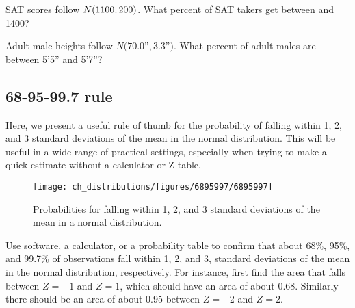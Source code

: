\begin{exercisewrap}
\begin{nexercise}
SAT scores follow $N(1100{}, 200{})$.
What percent of SAT takers get between \satmean{} and
1400?\footnotemark
\end{nexercise}
\end{exercisewrap}

\begin{exercisewrap}
\begin{nexercise}
Adult male heights follow $N(70.0$''$, 3.3$''$)$.
What percent of adult males are between 5'5''
and 5'7''?\footnotemark{}
\end{nexercise}
\end{exercisewrap}


\subsection{68-95-99.7 rule}

Here, we present a useful rule of thumb for the probability of falling within 1, 2, and 3 standard deviations of the mean in the normal distribution. This will be useful in a wide range of practical settings, especially when trying to make a quick estimate without a calculator or Z-table.

\begin{figure}[hht]
\centering
\texttt{[image: ch\_distributions/figures/6895997/6895997]}
\caption{Probabilities for falling within 1, 2, and 3 standard deviations of the mean in a normal distribution.}
\label{6895997}
\end{figure}

\begin{exercisewrap}
\begin{nexercise}
Use software, a calculator, or a probability table
to confirm that about 68\%, 95\%, and 99.7\%
of observations fall within 1, 2, and 3, standard deviations
of the mean in the normal distribution, respectively.
For instance, first find the area that falls between $Z=-1$
and $Z=1$, which should have an area of about 0.68.
Similarly there should be an area of about 0.95 between
$Z=-2$ and $Z=2$.\footnotemark{}
\end{nexercise}
\end{exercisewrap}

